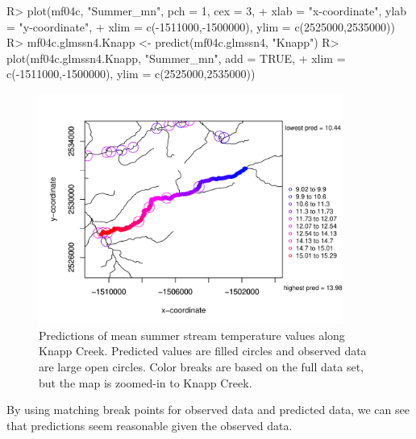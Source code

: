 \documentclass[nojss]{jss}
\renewenvironment{Schunk}{\vspace{\topsep}}{\vspace{\topsep}}
\begin{document}
\begin{Schunk}
\begin{Sinput}
R> plot(mf04c, "Summer_mn", pch = 1, cex = 3,
+     xlab = "x-coordinate", ylab = "y-coordinate",
+     xlim = c(-1511000,-1500000), ylim = c(2525000,2535000))
R> mf04c.glmssn4.Knapp <- predict(mf04c.glmssn4, "Knapp")
R> plot(mf04c.glmssn4.Knapp, "Summer_mn", add = TRUE,
+     xlim = c(-1511000,-1500000), ylim = c(2525000,2535000))
\end{Sinput}
\end{Schunk}

\begin{figure}[htbp]
  \begin{center}
    \includegraphics[keepaspectratio=true, width = 100mm]{Figures/jss984Fig-Preds2}
    \caption{Predictions of mean summer stream temperature values
      along Knapp Creek. Predicted values are filled circles
      and observed data are large open circles. Color breaks are based
      on the full data set, but the map is zoomed-in to Knapp Creek. \label{Preds2}}
  \end{center}
\end{figure}
By using matching break points for observed data and predicted data,
we can see that predictions seem reasonable given the observed data.
\end{document}
